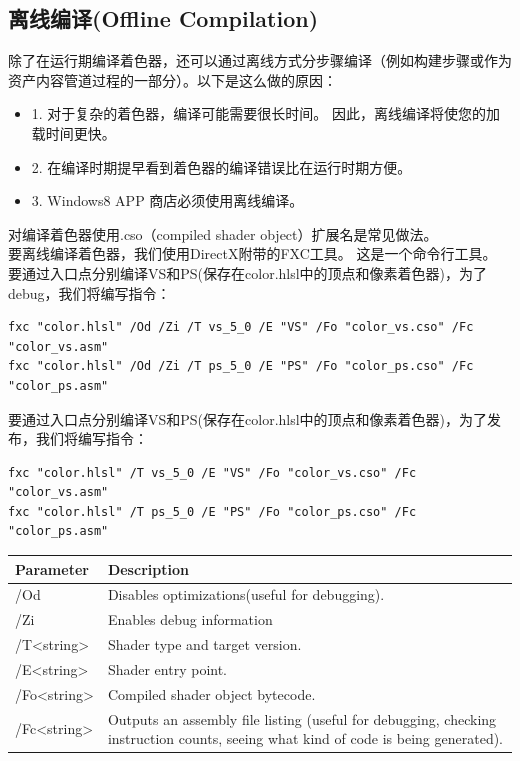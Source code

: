 \documentclass[11pt,a4paper,oldfontcommands]{memoir}
\begin{document}
{\subsection{离线编译(Offline Compilation)}
\begin{flushleft}
除了在运行期编译着色器，还可以通过离线方式分步骤编译（例如构建步骤或作为资产内容管道过程的一部分）。以下是这么做的原因：\\
\begin{itemize}
    \item 1. 对于复杂的着色器，编译可能需要很长时间。 因此，离线编译将使您的加载时间更快。
    \item 2. 在编译时期提早看到着色器的编译错误比在运行时期方便。
    \item 3. Windows8 APP 商店必须使用离线编译。
\end{itemize}
对编译着色器使用.cso（compiled shader object）扩展名是常见做法。\\
要离线编译着色器，我们使用DirectX附带的FXC工具。 这是一个命令行工具。 要通过入口点分别编译VS和PS(保存在color.hlsl中的顶点和像素着色器)，为了debug，我们将编写指令：\\
\begin{lstlisting}
fxc "color.hlsl" /Od /Zi /T vs_5_0 /E "VS" /Fo "color_vs.cso" /Fc "color_vs.asm"
fxc "color.hlsl" /Od /Zi /T ps_5_0 /E "PS" /Fo "color_ps.cso" /Fc "color_ps.asm"
\end{lstlisting}
要通过入口点分别编译VS和PS(保存在color.hlsl中的顶点和像素着色器)，为了发布，我们将编写指令：\\
\begin{lstlisting}
fxc "color.hlsl" /T vs_5_0 /E "VS" /Fo "color_vs.cso" /Fc "color_vs.asm"
fxc "color.hlsl" /T ps_5_0 /E "PS" /Fo "color_ps.cso" /Fc "color_ps.asm"
\end{lstlisting}
\begin{tabular}{|p{5em}|p{35em}|} 
\hline
Parameter & Description\\ 
\hline
/Od & Disables optimizations(useful for debugging).\\ 
\hline
/Zi & Enables debug information\\
\hline 
/T<string> & Shader type and target version.\\
\hline 
/E<string> & Shader entry point.\\
\hline 
/Fo<string> & Compiled shader object bytecode.\\
\hline 
/Fc<string> & Outputs an assembly file listing (useful for debugging, checking instruction counts, seeing what kind of code is being generated).\\ 

\end{tabular}
\end{flushleft}}
\end{document}
